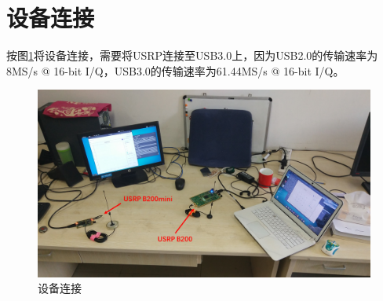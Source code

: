 	\section{设备连接}
		\par 按图\ref{fig:devices}将设备连接，需要将USRP连接至USB3.0上，因为USB2.0的传输速率为8MS/s @ 16-bit I/Q，USB3.0的传输速率为61.44MS/s @ 16-bit I/Q。
		\begin{figure}[htp]
			\centering
			\includegraphics[width=13cm]{figures/dvbt_x86.png}
			\caption{设备连接}
			\label{fig:devices}
		\end{figure}
